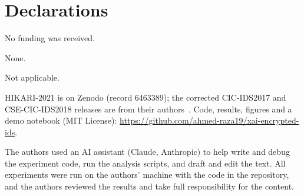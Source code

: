 \documentclass[pdflatex,iicol,sn-mathphys-num]{sn-jnl}
\begin{document}
\backmatter

\section*{Declarations}

 No funding was received.

 None.

 Not applicable.

 HIKARI-2021 is on Zenodo (record 6463389); the corrected CIC-IDS2017 and CSE-CIC-IDS2018 releases are from their authors~\cite{engelen2021,liu2022error}. Code, results, figures and a demo notebook (MIT License): \url{https://github.com/ahmed-raza19/xai-encrypted-ids}.

 The authors used an AI assistant (Claude, Anthropic) to help write and debug the experiment code, run the analysis scripts, and draft and edit the text. All experiments were run on the authors' machine with the code in the repository, and the authors reviewed the results and take full responsibility for the content.


\end{document}
